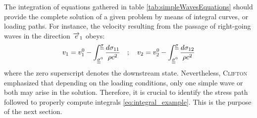 The integration of equations gathered in table \ref{tab:simpleWavesEquations} should provide the complete solution of a given problem by means of integral curves, or loading paths.
For instance, the velocity resulting from the passage of right-going waves in the direction ${\overrightarrow{e}}_1$ obeys:
\begin{equation}
  \label{eq:integral_example}
  v_1 = v_1^0 - \int_{{\underline{\underline{\sigma}}}^0}^{{\underline{\underline{\sigma}}}} \frac{d \sigma_{11}}{\rho c^2} \quad ;\quad v_2 = v_2^0 - \int_{{\underline{\underline{\sigma}}}^0}^{{\underline{\underline{\sigma}}}} \frac{d \sigma_{12}}{\rho c^2}
\end{equation}
where the zero superscript denotes the downstream state.
Nevertheless, \textsc{Clifton} \cite{Clifton} emphasized that depending on the loading conditions, only one simple wave or both may arise in the solution.
Therefore, it is crucial to identify the stress path followed to properly compute integrals \eqref{eq:integral_example}.
This is the purpose of the next section.



